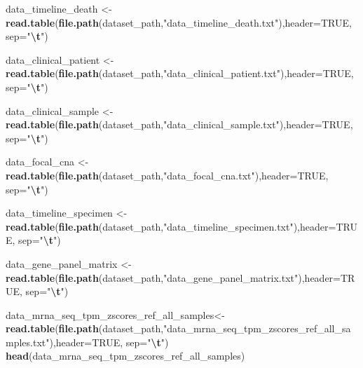 \documentclass[
]{article}
\newenvironment{Shaded}{\begin{snugshade}}{\end{snugshade}}
\newcommand{\AttributeTok}[1]{\textcolor[rgb]{0.13,0.29,0.53}{#1}}
\newcommand{\ConstantTok}[1]{\textcolor[rgb]{0.56,0.35,0.01}{#1}}
\newcommand{\FunctionTok}[1]{\textcolor[rgb]{0.13,0.29,0.53}{\textbf{#1}}}
\newcommand{\NormalTok}[1]{#1}
\newcommand{\OtherTok}[1]{\textcolor[rgb]{0.56,0.35,0.01}{#1}}
\newcommand{\SpecialCharTok}[1]{\textcolor[rgb]{0.81,0.36,0.00}{\textbf{#1}}}
\newcommand{\StringTok}[1]{\textcolor[rgb]{0.31,0.60,0.02}{#1}}
\begin{document}
\begin{Shaded}
\begin{Highlighting}[]
\NormalTok{data\_timeline\_death  }\OtherTok{\textless{}{-}} \FunctionTok{read.table}\NormalTok{(}\FunctionTok{file.path}\NormalTok{(dataset\_path,}\StringTok{"data\_timeline\_death.txt"}\NormalTok{),}\AttributeTok{header=}\ConstantTok{TRUE}\NormalTok{, }\AttributeTok{sep=}\StringTok{"}\SpecialCharTok{\textbackslash{}t}\StringTok{"}\NormalTok{)       }


\NormalTok{data\_clinical\_patient   }\OtherTok{\textless{}{-}} \FunctionTok{read.table}\NormalTok{(}\FunctionTok{file.path}\NormalTok{(dataset\_path,}\StringTok{"data\_clinical\_patient.txt"}\NormalTok{),}\AttributeTok{header=}\ConstantTok{TRUE}\NormalTok{, }\AttributeTok{sep=}\StringTok{"}\SpecialCharTok{\textbackslash{}t}\StringTok{"}\NormalTok{) }


\NormalTok{data\_clinical\_sample          }\OtherTok{\textless{}{-}} \FunctionTok{read.table}\NormalTok{(}\FunctionTok{file.path}\NormalTok{(dataset\_path,}\StringTok{"data\_clinical\_sample.txt"}\NormalTok{),}\AttributeTok{header=}\ConstantTok{TRUE}\NormalTok{, }\AttributeTok{sep=}\StringTok{"}\SpecialCharTok{\textbackslash{}t}\StringTok{"}\NormalTok{)       }


\NormalTok{data\_focal\_cna         }\OtherTok{\textless{}{-}} \FunctionTok{read.table}\NormalTok{(}\FunctionTok{file.path}\NormalTok{(dataset\_path,}\StringTok{"data\_focal\_cna.txt"}\NormalTok{),}\AttributeTok{header=}\ConstantTok{TRUE}\NormalTok{, }\AttributeTok{sep=}\StringTok{"}\SpecialCharTok{\textbackslash{}t}\StringTok{"}\NormalTok{)               }

\NormalTok{data\_timeline\_specimen  }\OtherTok{\textless{}{-}} \FunctionTok{read.table}\NormalTok{(}\FunctionTok{file.path}\NormalTok{(dataset\_path,}\StringTok{"data\_timeline\_specimen.txt"}\NormalTok{),}\AttributeTok{header=}\ConstantTok{TRUE}\NormalTok{, }\AttributeTok{sep=}\StringTok{"}\SpecialCharTok{\textbackslash{}t}\StringTok{"}\NormalTok{)                 }


\NormalTok{data\_gene\_panel\_matrix  }\OtherTok{\textless{}{-}} \FunctionTok{read.table}\NormalTok{(}\FunctionTok{file.path}\NormalTok{(dataset\_path,}\StringTok{"data\_gene\_panel\_matrix.txt"}\NormalTok{),}\AttributeTok{header=}\ConstantTok{TRUE}\NormalTok{, }\AttributeTok{sep=}\StringTok{"}\SpecialCharTok{\textbackslash{}t}\StringTok{"}\NormalTok{)                  }



\NormalTok{data\_mrna\_seq\_tpm\_zscores\_ref\_all\_samples}\OtherTok{\textless{}{-}} \FunctionTok{read.table}\NormalTok{(}\FunctionTok{file.path}\NormalTok{(dataset\_path,}\StringTok{"data\_mrna\_seq\_tpm\_zscores\_ref\_all\_samples.txt"}\NormalTok{),}\AttributeTok{header=}\ConstantTok{TRUE}\NormalTok{, }\AttributeTok{sep=}\StringTok{"}\SpecialCharTok{\textbackslash{}t}\StringTok{"}\NormalTok{)}
\FunctionTok{head}\NormalTok{(data\_mrna\_seq\_tpm\_zscores\_ref\_all\_samples)}
\end{Highlighting}
\end{Shaded}
\end{document}

